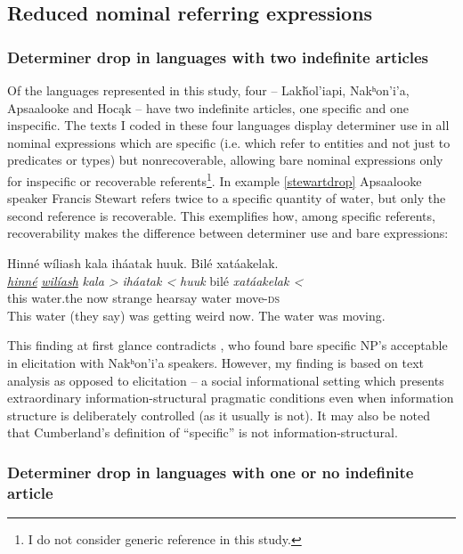 \documentclass[output=paper]{LSP/langsci}
\begin{document}
\subsection{Reduced nominal referring expressions}\label{nominalreduction}

\subsubsection{Determiner drop in languages with two indefinite articles}\label{droptwoindef}

Of the languages represented in this study, four -- Lakȟol’iapi, Nakʰon’i’a, Apsaalooke and Hocąk -- have two indefinite articles, one specific and one inspecific. The texts I coded in these four languages display determiner use in all nominal expressions which are specific (i.e. which refer to entities and not just to predicates or types) but nonrecoverable, allowing bare nominal expressions only for inspecific or recoverable referents\footnote{I do not consider generic reference in this study.}. In example \ref{stewartdrop} Apsaalooke speaker Francis Stewart refers twice to a specific quantity of water, but only the second reference is recoverable. This exemplifies how, among specific referents, recoverability makes the difference between determiner use and bare expressions:

\ea\label{stewartdrop}
Hinné wíliash kala iháatak huuk. Bilé xatáakelak.\footnotemark\\
\gll	\emph{\underline{hinné}} 	\emph{\underline{wilíash}} 		\emph{kala >} 	\emph{iháatak <}		\emph{huuk} 	bilé 		\emph{xatáakelak <}\\
	this 				water.the 					now 			strange 			hearsay 		water		move-\textsc{ds}\\
\glt	This water (they say) was getting weird now. The water was moving.
\z

This finding at first glance contradicts \citet{Cumberland2005}, who found bare specific NP’s acceptable in elicitation with Nakʰon’i’a speakers. However, my finding is based on text analysis as opposed to elicitation -- a social informational setting which presents extraordinary information-structural pragmatic conditions even when information structure is deliberately controlled (as it usually is not). It may also be noted that Cumberland’s definition of “specific” is not information-structural.

\subsubsection{Determiner drop in languages with one or no indefinite article}\label{droponeindef}
\end{document}

